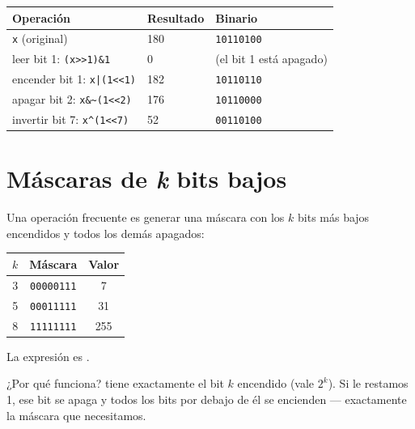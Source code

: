 \documentclass[12pt, oneside]{article}
\begin{document}
\begin{ejemplo}[\texttt{x = 0b10110100}, operaciones con distintos bits]
\begin{center}
\begin{tabular}{lll}
  \toprule
  \textbf{Operación} & \textbf{Resultado} & \textbf{Binario} \\
  \midrule
  \texttt{x} (original)           & 180 & \texttt{10110100} \\
  leer bit 1: \texttt{(x>>1)\&1}  & 0   & (el bit 1 está apagado) \\
  encender bit 1: \texttt{x|(1<<1)} & 182 & \texttt{10110110} \\
  apagar bit 2: \texttt{x\&\textasciitilde(1<<2)} & 176 & \texttt{10110000} \\
  invertir bit 7: \texttt{x\^{}(1<<7)} & 52 & \texttt{00110100} \\
  \bottomrule
\end{tabular}
\end{center}
\end{ejemplo}

\section{Máscaras de \textit{k} bits bajos}

Una operación frecuente es generar una máscara con los $k$ bits más bajos
encendidos y todos los demás apagados:

\begin{center}
\begin{tabular}{ccc}
  \toprule
  $k$ & \textbf{Máscara} & \textbf{Valor} \\
  \midrule
  3 & \texttt{00000111} &  7 \\
  5 & \texttt{00011111} & 31 \\
  8 & \texttt{11111111} & 255 \\
  \bottomrule
\end{tabular}
\end{center}

La expresión es .

¿Por qué funciona?  tiene exactamente el bit $k$ encendido
(vale $2^k$). Si le restamos 1, ese bit se apaga y todos los bits por
debajo de él se encienden — exactamente la máscara que necesitamos.
\end{document}
